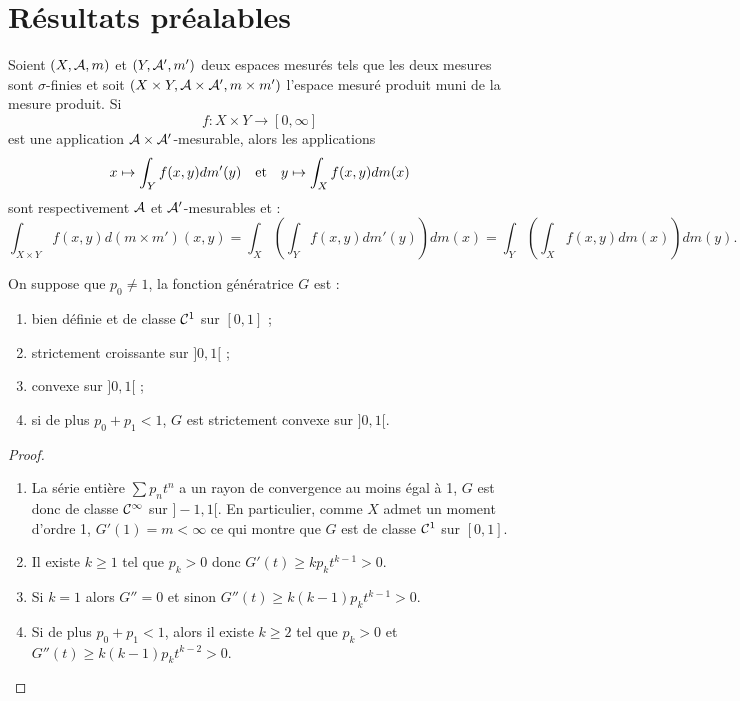 \section{Résultats préalables}

\begin{thm}
Soient $(X, \mathcal{A}, m)$ et $(Y, \mathcal{A}', m')$ deux espaces mesurés tels que les deux mesures sont $\sigma$-finies et soit 
$(X \times Y, \mathcal{A} \times \mathcal{A}', m \times m')$ l'espace mesuré produit muni de la mesure produit. Si
\[ f : X \times Y \to [0, \infty] \]
est une application $\mathcal{A} \times \mathcal{A}'$-mesurable, alors les applications 
\[ x \mapsto \int_Y f(x,y) dm'(y) \quad \text{et} \quad y \mapsto \int_X f(x,y) dm(x) \]
sont respectivement $\mathcal{A}$ et $\mathcal{A}'$-mesurables et :
\[ \int_{X \times Y} f(x,y) d(m\times m')(x, y) = \int_X \left ( \int_Y f(x,y) dm'(y) \right) dm(x) 
= \int_Y \left( \int_X f(x,y) dm(x) \right ) dm(y) . \]
\end{thm}

\begin{lem}
On suppose que $p_0 \neq 1$, la fonction génératrice $G$ est :
\begin{enumerate}[label=(\alph*)]
\item bien définie et de classe $\mathcal{C}^1$ sur $[0,1]$ ;
\item strictement croissante sur $]0,1[$ ;
\item convexe sur $]0,1[$ ;
\item si de plus $p_0+p_1<1$, $G$ est strictement convexe sur $]0,1[$.
\end{enumerate}
\end{lem}

\begin{proof}
\begin{enumerate}[label=(\alph*)]
\item La série entière $\sum p_n t^n$ a un rayon de convergence au moins égal à 1, $G$ est donc de classe $\mathcal{C}^{\infty}$ sur $]-1, 1[$.
En particulier, comme $X$ admet un moment d'ordre 1, $G'(1) = m < \infty$ ce qui montre que $G$ est de classe $\mathcal{C}^1$ sur $[0,1]$.
\item Il existe $k \geq 1$ tel que $p_k > 0$ donc $G'(t) \geq k p_k t^{k-1} > 0$. 
\item Si $k=1$ alors $G''=0$ et sinon $G''(t) \geq k(k-1) p_k t^{k-1} > 0$.
\item Si de plus $p_0+p_1 < 1$, alors il existe $k \geq 2$ tel que $p_k > 0$ et $G''(t) \geq k(k-1) p_k t^{k-2} > 0$.
\end{enumerate}
\end{proof}

